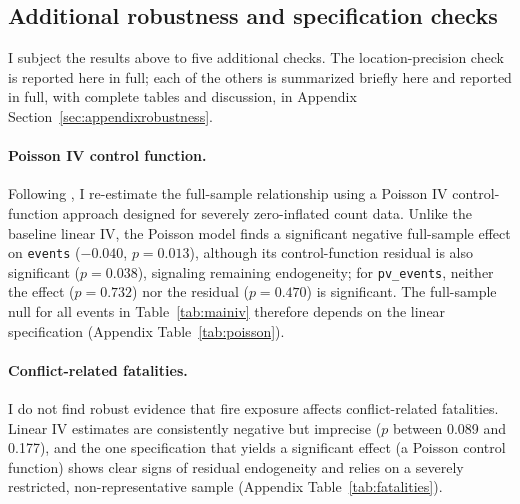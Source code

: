 \documentclass[12pt]{article}
\begin{document}
\subsection{Additional robustness and specification checks}
\label{sec:robustness-summary}

I subject the results above to five additional checks. The location-precision check is reported here in full; each of the others is summarized briefly here and reported in full, with complete tables and discussion, in Appendix Section~\ref{sec:appendixrobustness}.

\paragraph{Poisson IV control function.} Following \citet{lu2023fish}, I re-estimate the full-sample relationship using a Poisson IV control-function approach \citep{terzabasurathouz2008} designed for severely zero-inflated count data. Unlike the baseline linear IV, the Poisson model finds a significant negative full-sample effect on \texttt{events} ($-0.040$, $p=0.013$), although its control-function residual is also significant ($p=0.038$), signaling remaining endogeneity; for \texttt{pv\_events}, neither the effect ($p=0.732$) nor the residual ($p=0.470$) is significant. The full-sample null for all events in Table~\ref{tab:mainiv} therefore depends on the linear specification (Appendix Table~\ref{tab:poisson}).

\paragraph{Conflict-related fatalities.} I do not find robust evidence that fire exposure affects conflict-related fatalities. Linear IV estimates are consistently negative but imprecise ($p$ between 0.089 and 0.177), and the one specification that yields a significant effect (a Poisson control function) shows clear signs of residual endogeneity and relies on a severely restricted, non-representative sample (Appendix Table~\ref{tab:fatalities}).
\end{document}
